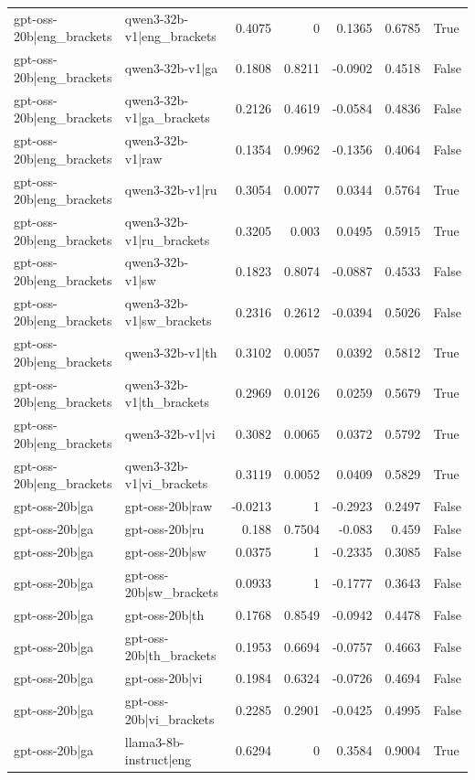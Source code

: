 \begin{table}
\begin{tabular}{l l r r r r l}
gpt-oss-20b|eng_brackets & qwen3-32b-v1|eng_brackets & 0.4075 & 0 & 0.1365 & 0.6785 & True \\
gpt-oss-20b|eng_brackets & qwen3-32b-v1|ga & 0.1808 & 0.8211 & -0.0902 & 0.4518 & False \\
gpt-oss-20b|eng_brackets & qwen3-32b-v1|ga_brackets & 0.2126 & 0.4619 & -0.0584 & 0.4836 & False \\
gpt-oss-20b|eng_brackets & qwen3-32b-v1|raw & 0.1354 & 0.9962 & -0.1356 & 0.4064 & False \\
gpt-oss-20b|eng_brackets & qwen3-32b-v1|ru & 0.3054 & 0.0077 & 0.0344 & 0.5764 & True \\
gpt-oss-20b|eng_brackets & qwen3-32b-v1|ru_brackets & 0.3205 & 0.003 & 0.0495 & 0.5915 & True \\
gpt-oss-20b|eng_brackets & qwen3-32b-v1|sw & 0.1823 & 0.8074 & -0.0887 & 0.4533 & False \\
gpt-oss-20b|eng_brackets & qwen3-32b-v1|sw_brackets & 0.2316 & 0.2612 & -0.0394 & 0.5026 & False \\
gpt-oss-20b|eng_brackets & qwen3-32b-v1|th & 0.3102 & 0.0057 & 0.0392 & 0.5812 & True \\
gpt-oss-20b|eng_brackets & qwen3-32b-v1|th_brackets & 0.2969 & 0.0126 & 0.0259 & 0.5679 & True \\
gpt-oss-20b|eng_brackets & qwen3-32b-v1|vi & 0.3082 & 0.0065 & 0.0372 & 0.5792 & True \\
gpt-oss-20b|eng_brackets & qwen3-32b-v1|vi_brackets & 0.3119 & 0.0052 & 0.0409 & 0.5829 & True \\
gpt-oss-20b|ga & gpt-oss-20b|raw & -0.0213 & 1 & -0.2923 & 0.2497 & False \\
gpt-oss-20b|ga & gpt-oss-20b|ru & 0.188 & 0.7504 & -0.083 & 0.459 & False \\
gpt-oss-20b|ga & gpt-oss-20b|sw & 0.0375 & 1 & -0.2335 & 0.3085 & False \\
gpt-oss-20b|ga & gpt-oss-20b|sw_brackets & 0.0933 & 1 & -0.1777 & 0.3643 & False \\
gpt-oss-20b|ga & gpt-oss-20b|th & 0.1768 & 0.8549 & -0.0942 & 0.4478 & False \\
gpt-oss-20b|ga & gpt-oss-20b|th_brackets & 0.1953 & 0.6694 & -0.0757 & 0.4663 & False \\
gpt-oss-20b|ga & gpt-oss-20b|vi & 0.1984 & 0.6324 & -0.0726 & 0.4694 & False \\
gpt-oss-20b|ga & gpt-oss-20b|vi_brackets & 0.2285 & 0.2901 & -0.0425 & 0.4995 & False \\
gpt-oss-20b|ga & llama3-8b-instruct|eng & 0.6294 & 0 & 0.3584 & 0.9004 & True \\

\end{tabular}
\end{table}
